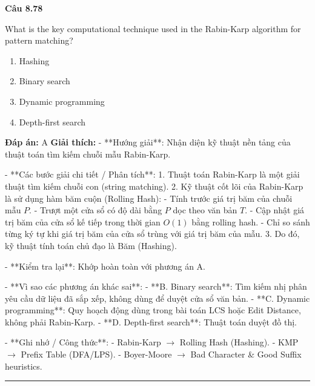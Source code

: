 \documentclass[11pt,a4paper]{article}
\newenvironment{question}[1]{%
  \par\vspace{1em}\noindent\textbf{\large Câu #1}\par\vspace{0.4em}
}{%
  \par\vspace{1em}\hrule\vspace{0.6em}
}
\newenvironment{choices}{%
  \begin{enumerate}[label=\textbf{\Alph*.},leftmargin=2.2em,itemsep=2pt,topsep=3pt]
}{%
  \end{enumerate}
}
\newcommand{\choice}{\item}
\begin{document}
\begin{question}{8.78}
What is the key computational technique used in the Rabin-Karp algorithm for pattern matching?
\begin{choices}
\choice Hashing
\choice Binary search
\choice Dynamic programming
\choice Depth-first search
\end{choices}
\textbf{Đáp án:} A
\textbf{Giải thích:} - **Hướng giải**:
  Nhận diện kỹ thuật nền tảng của thuật toán tìm kiếm chuỗi mẫu Rabin-Karp.

- **Các bước giải chi tiết / Phân tích**:
  1. Thuật toán Rabin-Karp là một giải thuật tìm kiếm chuỗi con (string matching).
  2. Kỹ thuật cốt lõi của Rabin-Karp là sử dụng hàm băm cuộn (Rolling Hash):
     - Tính trước giá trị băm của chuỗi mẫu \(P\).
     - Trượt một cửa sổ có độ dài bằng \(P\) dọc theo văn bản \(T\).
     - Cập nhật giá trị băm của cửa sổ kế tiếp trong thời gian \(O(1)\) bằng rolling hash.
     - Chỉ so sánh từng ký tự khi giá trị băm của cửa sổ trùng với giá trị băm của mẫu.
  3. Do đó, kỹ thuật tính toán chủ đạo là Băm (Hashing).

- **Kiểm tra lại**:
  Khớp hoàn toàn với phương án A.

- **Vì sao các phương án khác sai**:
  - **B. Binary search**: Tìm kiếm nhị phân yêu cầu dữ liệu đã sắp xếp, không dùng để duyệt cửa sổ văn bản.
  - **C. Dynamic programming**: Quy hoạch động dùng trong bài toán LCS hoặc Edit Distance, không phải Rabin-Karp.
  - **D. Depth-first search**: Thuật toán duyệt đồ thị.

- **Ghi nhớ / Công thức**:
  - Rabin-Karp \(\rightarrow\) Rolling Hash (Hashing).
  - KMP \(\rightarrow\) Prefix Table (DFA/LPS).
  - Boyer-Moore \(\rightarrow\) Bad Character & Good Suffix heuristics.
\end{question}
\end{document}
